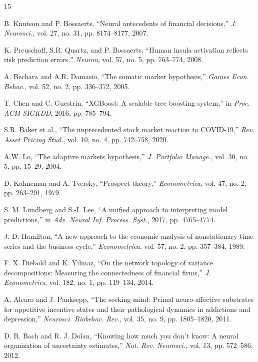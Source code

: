 \documentclass[conference]{IEEEtran}
\begin{document}
\begin{thebibliography}{15}

B. Knutson and P. Bossaerts, ``Neural antecedents of financial decisions,'' \textit{J. Neurosci.}, vol. 27, no. 31, pp. 8174--8177, 2007.

K. Preuschoff, S.R. Quartz, and P. Bossaerts, ``Human insula activation reflects risk prediction errors,'' \textit{Neuron}, vol. 57, no. 5, pp. 763--774, 2008.

A. Bechara and A.R. Damasio, ``The somatic marker hypothesis,'' \textit{Games Econ. Behav.}, vol. 52, no. 2, pp. 336--372, 2005.

T. Chen and C. Guestrin, ``XGBoost: A scalable tree boosting system,'' in \textit{Proc. ACM SIGKDD}, 2016, pp. 785--794.

S.R. Baker et al., ``The unprecedented stock market reaction to COVID-19,'' \textit{Rev. Asset Pricing Stud.}, vol. 10, no. 4, pp. 742--758, 2020.

A.W. Lo, ``The adaptive markets hypothesis,'' \textit{J. Portfolio Manage.}, vol. 30, no. 5, pp. 15--29, 2004.

D. Kahneman and A. Tversky, ``Prospect theory,'' \textit{Econometrica}, vol. 47, no. 2, pp. 263--291, 1979.

S. M. Lundberg and S.-I. Lee, ``A unified approach to interpreting model predictions,'' in \textit{Adv. Neural Inf. Process. Syst.}, 2017, pp. 4765--4774.

J. D. Hamilton, ``A new approach to the economic analysis of nonstationary time series and the business cycle,'' \textit{Econometrica}, vol. 57, no. 2, pp. 357--384, 1989.

F. X. Diebold and K. Yilmaz, ``On the network topology of variance decompositions: Measuring the connectedness of financial firms,'' \textit{J. Econometrics}, vol. 182, no. 1, pp. 119--134, 2014.


A. Alcaro and J. Panksepp, ``The seeking mind: Primal neuro-affective substrates for appetitive incentive states and their pathological dynamics in addictions and depression,'' \textit{Neurosci. Biobehav. Rev.}, vol. 35, no. 9, pp. 1805--1820, 2011.

D. R. Bach and R. J. Dolan, ``Knowing how much you don't know: A neural organization of uncertainty estimates,'' \textit{Nat. Rev. Neurosci.}, vol. 13, pp. 572--586, 2012.


\end{thebibliography}
\end{document}
